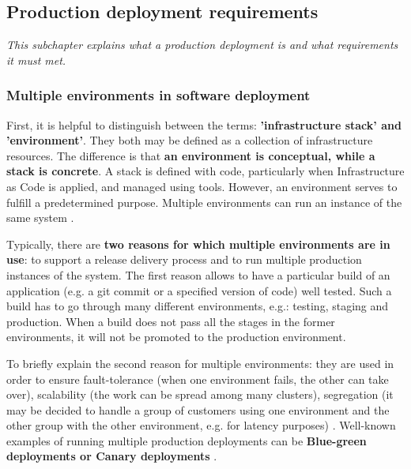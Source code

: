 \subsection{Production deployment requirements}
\label{2-prod-req}
\textit{This subchapter explains what a production deployment is and what requirements it must met.}
~\\

\subsubsection{Multiple environments in software deployment}
First, it is helpful to distinguish between the terms: \textbf{'infrastructure stack' and 'environment'}. They both may be defined as a collection of infrastructure resources. The difference is that \textbf{an environment is conceptual, while a stack is concrete}. A stack is defined with code, particularly when Infrastructure as Code is applied, and managed using tools. However, an environment serves to fulfill a predetermined purpose. Multiple environments can run an instance of the same system \cite{book-iac}.

Typically, there are \textbf{two reasons for which multiple environments are in use}: to support a release delivery process and to run multiple production instances of the system. The first reason allows to have a particular build of an application (e.g. a git commit or a specified version of code) well tested. Such a build has to go through many different environments, e.g.: testing, staging and production. When a build does not pass all the stages in the former environments, it will not be promoted to the production environment\cite{book-iac,book-cicd}.

To briefly explain the second reason for multiple environments: they are used in order to ensure fault-tolerance (when one environment fails, the other can take over), scalability (the work can be spread among many clusters), segregation (it may be decided to handle a group of customers using one environment and the other group with the other environment, e.g. for latency purposes) \cite{book-iac}. Well-known examples of running multiple production deployments can be \textbf{Blue-green deployments or Canary deployments} \cite{bachelor-ha}.

